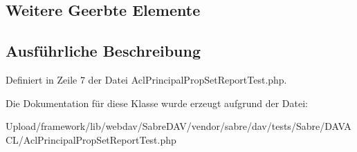 \subsection*{Weitere Geerbte Elemente}


\subsection{Ausführliche Beschreibung}


Definiert in Zeile 7 der Datei Acl\+Principal\+Prop\+Set\+Report\+Test.\+php.



Die Dokumentation für diese Klasse wurde erzeugt aufgrund der Datei\+:\begin{DoxyCompactItemize}
\item 
Upload/framework/lib/webdav/\+Sabre\+D\+A\+V/vendor/sabre/dav/tests/\+Sabre/\+D\+A\+V\+A\+C\+L/Acl\+Principal\+Prop\+Set\+Report\+Test.\+php\end{DoxyCompactItemize}
